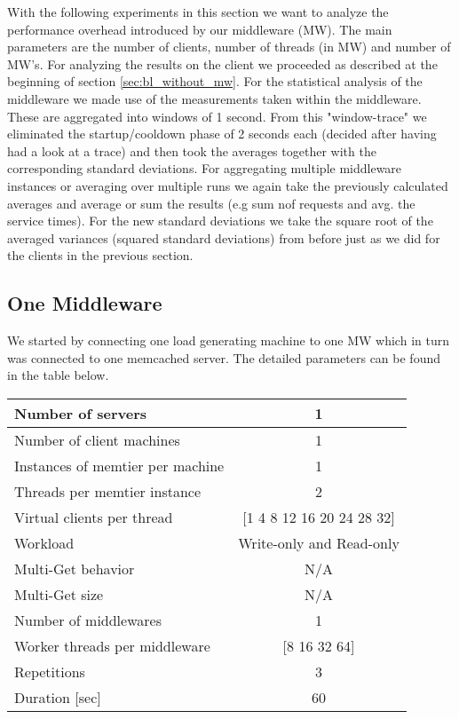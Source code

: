 \documentclass[11pt,a4paper]{article}
\begin{document}
With the following experiments in this section we want to analyze the performance overhead introduced by our middleware (MW). The main parameters are the number of clients, number of threads (in MW) and number of MW's. For analyzing the results on the client we proceeded as described at the beginning of section \ref{sec:bl_without_mw}. For the statistical analysis of the middleware we made use of the measurements taken within the middleware. These are aggregated into windows of 1 second. From this "window-trace" we eliminated the startup/cooldown phase of 2 seconds each (decided after having had a look at a trace) and then took the averages together with the corresponding standard deviations. For aggregating multiple middleware instances or averaging over multiple runs we again take the previously calculated averages and average or sum the results (e.g sum nof requests and avg. the service times). For the new standard deviations we take the square root of the averaged variances (squared standard deviations) from before just as we did for the clients in the previous section.


\subsection{One Middleware}\label{sub:one_mw}

We started by connecting one load generating machine to one MW which in turn was connected to one memcached server. The detailed parameters can be found in the table below.

\begin{center}
	\scriptsize{
		\begin{tabular}{|l|c|}
			\hline Number of servers                & 1                        \\ 
			\hline Number of client machines        & 1                        \\ 
			\hline Instances of memtier per machine & 1                        \\ 
			\hline Threads per memtier instance     & 2                        \\
			\hline Virtual clients per thread       & [1 4 8 12 16 20 24 28 32]                  \\ 
			\hline Workload                         & Write-only and Read-only \\
			\hline Multi-Get behavior               & N/A                      \\
			\hline Multi-Get size                   & N/A                      \\
			\hline Number of middlewares            & 1                        \\
			\hline Worker threads per middleware    & [8 16 32 64]                  \\
			\hline Repetitions                      & 3                \\ 
		\hline Duration [sec]                      & 60              \\ 

			\hline 
		\end{tabular}
	} 
\end{center}
\end{document}

